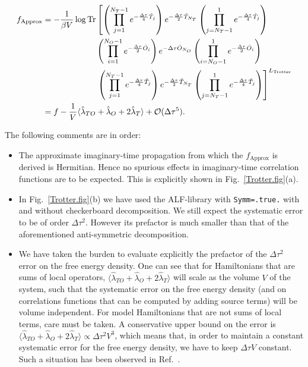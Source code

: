 \begin{align}
f_{\text{Approx} }  &=  
\begin{aligned}[t]
   -\frac{1}{\beta V } \log \mathop{\mathrm{Tr}} &\left[ \left(\prod_{j=1}^{N_T-1} e^{-\frac{\Delta \tau}{4} \hat{T}_j } \right)    e^{-\frac{\Delta \tau}{2} \hat{T}_{N_T} }    
   \left(  \prod_{j=N_T-1}^{1} e^{-\frac{\Delta \tau}{4} \hat{T}_j } \right)     \right. \nonumber \\   
   &\left(\prod_{i=1}^{N_O-1} e^{-\frac{\Delta \tau}{2} \hat{O}_i } \right)    e^{-\Delta \tau \hat{O}_{N_O} }    
     \left( \prod_{i=N_O-1}^{1} e^{-\frac{\Delta \tau}{2} \hat{O}_i } \right)   \nonumber  \\
   &\left.   \left(\prod_{j=1}^{N_T-1} e^{-\frac{\Delta \tau}{4} \hat{T}_j } \right)    e^{-\frac{\Delta \tau}{2} \hat{T}_{N_T} }    
   \left(  \prod_{j=N_T-1}^{1} e^{-\frac{\Delta \tau}{4} \hat{T}_j } \right)   
   \right]^{L_{\text{Trotter}}}  \nonumber 
\end{aligned}\\
   &= f    - \frac{1}{V}   \langle \hat{\lambda}_{TO} + \hat{\lambda}_{O} + 2 \hat{\lambda}_{T} \rangle  + \mathcal{O}( \Delta \tau ^5).
\end{align}

The following comments are in order:
\begin{itemize}
\item   The approximate imaginary-time propagation from which the $f_{\text{Approx} } $ is derived is Hermitian.  Hence no spurious effects in imaginary-time correlation functions are to be expected.  This is explicitly shown in Fig.~\ref{Trotter.fig}(a).
\item  In Fig.~\ref{Trotter.fig}(b) we  have used the ALF-library with   \texttt{Symm=.true.}  with and without checkerboard decomposition.  We still expect the systematic error to be of order $\Delta \tau ^2 $.  However its prefactor is much smaller than that of the aforementioned  anti-symmetric decomposition.
\item   We have taken the burden to evaluate explicitly the prefactor of the $\Delta \tau ^2$ error on the free energy density.  One can  see that for Hamiltonians  that are sums of local  operators, $ \langle \hat{\lambda}_{TO} + \hat{\lambda}_{O} + 2 \hat{\lambda}_{T} \rangle  $   will scale as the volume $V$  of the system, such that the systematic error on the free energy density (and on correlations functions that can be computed  by adding source terms)  will be  volume  independent. For model  Hamiltonians that are not sums of local terms, care must be taken.  A conservative upper bound on the  error is $ \langle \hat{\lambda}_{TO} + \hat{\lambda}_{O} + 2 \hat{\lambda}_{T} \rangle    \propto \Delta \tau^2 V^3 $, which means that, in order to maintain a constant systematic error for the free energy density, we have to keep $ \Delta \tau V $ constant. Such a situation has been observed in Ref.~\cite{WangZ20}.
\end{itemize}


